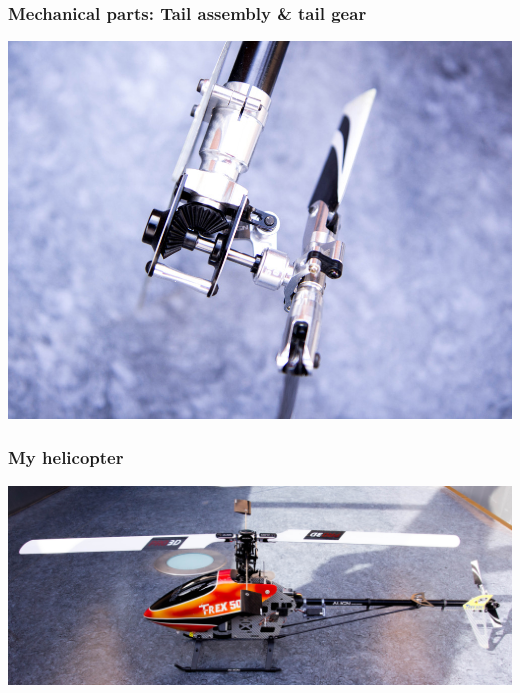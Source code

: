 \documentclass{beamer}
\begin{document}
\begin{frame}
\frametitle{Mechanical parts: Tail assembly \& tail gear}

\begin{center}
	\includegraphics[width=.8\textwidth]{images/IMG_0654_cropped_smaller}
\end{center}

\end{frame}

\begin{frame}
\frametitle{My helicopter}

\begin{center}
	\includegraphics[width=\textwidth]{images/IMG_0618_cropped_smaller}
\end{center}

\end{frame}

%
%
%
\end{document}
